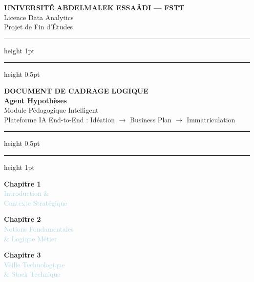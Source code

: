 \documentclass[12pt, a4paper]{report}
\begin{document}
\onehalfspacing

\begin{titlepage}
\pagecolor{navyblue}
\color{white}
\begin{center}

\vspace*{1.5cm}

{\small\bfseries\color{lightblue} UNIVERSITÉ ABDELMALEK ESSAÂDI — FSTT}\\[4pt]
{\small\color{lightblue} Licence Data Analytics}\\[6pt]
{\small\color{lightblue} Projet de Fin d'Études}

\vspace{1.2cm}
\textcolor{midblue}{\hrule height 1pt}
\vspace{0.3cm}
\textcolor{rulegray}{\hrule height 0.5pt}
\vspace{1.2cm}

{\fontsize{13}{18}\selectfont\bfseries\color{lightblue}
DOCUMENT DE CADRAGE LOGIQUE}\\[10pt]

{\fontsize{26}{34}\selectfont\bfseries\color{white}
Agent Hypothèses}\\[14pt]

{\fontsize{14}{20}\selectfont\color{lightblue}
Module Pédagogique Intelligent}\\[6pt]

{\fontsize{11}{16}\selectfont\color{rulegray}
Plateforme IA End-to-End :
Idéation $\rightarrow$ Business Plan $\rightarrow$ Immatriculation}

\vspace{1.2cm}
\textcolor{rulegray}{\hrule height 0.5pt}
\vspace{0.3cm}
\textcolor{midblue}{\hrule height 1pt}
\vspace{1.8cm}

\begin{minipage}{0.3\textwidth}
\centering
\textcolor{midblue}{\large\bfseries Chapitre 1}\\[4pt]
\textcolor{lightblue}{\small Introduction \&\\Contexte Stratégique}
\end{minipage}
\hfill
\begin{minipage}{0.3\textwidth}
\centering
\textcolor{midblue}{\large\bfseries Chapitre 2}\\[4pt]
\textcolor{lightblue}{\small Notions Fondamentales\\\& Logique Métier}
\end{minipage}
\hfill
\begin{minipage}{0.3\textwidth}
\centering
\textcolor{midblue}{\large\bfseries Chapitre 3}\\[4pt]
\textcolor{lightblue}{\small Veille Technologique\\\& Stack Technique}
\end{minipage}


\end{center}
\end{titlepage}
\end{document}
